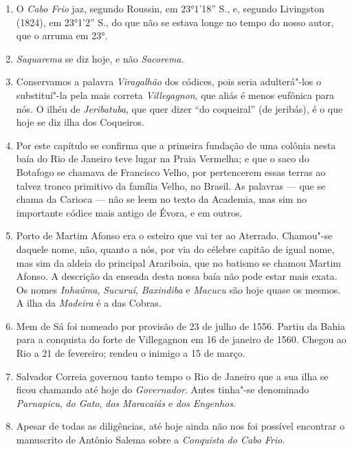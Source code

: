 \begin{enumerate}
\item O \textit{Cabo Frio} jaz, segundo Roussin, em 23°1'18'' S., e, segundo Livingston (1824), 
em 23°1'2'' S., do que não se estava longe no tempo do nosso autor, que o arruma em 
23°. 

\item \textit{Saquarema} se diz hoje, e não \textit{Sacorema}.

\item Conservamos a palavra \textit{Viragalhão} dos códices, pois seria adulterá"-los o 
substituí"-la pela mais correta \textit{Villegagnon}, que aliás é menos eufônica para nós. 
O ilhéu de  \textit{Jeribatuba}, que quer dizer ``do coqueiral'' (de jeribás),
é o que hoje se diz ilha dos Coqueiros.

\item Por este capítulo se confirma que a primeira fundação de uma colônia nesta baía  
do Rio de Janeiro teve lugar na Praia Vermelha; e que o saco do Botafogo se chamava 
de Francisco Velho, por pertencerem essas terras ao  talvez tronco  primitivo da 
família Velho, no Brasil.
As palavras --- que se chama da Carioca --- não se leem no texto da Academia, mas 
sim no importante códice mais antigo de Évora, e em outros.

\item  Porto de Martim Afonso era o esteiro que vai ter ao Aterrado.
Chamou"-se daquele nome, não, quanto a nós, por via do célebre capitão de
igual nome, mas sim da aldeia do principal Arariboia, que no batismo se
chamou Martim Afonso.
A descrição da enseada desta nossa baía não pode estar mais exata. Os nomes  
\textit{Inhaúma}, \textit{Sucuruí}, \textit{Baxindiba} e \textit{Macucu}  são hoje quase os mesmos. A ilha da \textit{Madeira} é a 
das Cobras.

\item Mem de Sá foi nomeado por provisão de 23 de julho de 1556. Partiu da Bahia para a 
conquista do forte de Villegagnon em 16 de janeiro de 1560. Chegou ao Rio a 21 de 
fevereiro; rendeu o inimigo a 15 de março.

\item Salvador Correia governou tanto tempo o Rio de Janeiro que a sua ilha se ficou 
chamando até hoje do \textit{Governador}. Antes tinha"-se denominado \textit{Parnapicu}, 
\textit{do Gato}, \textit{dos Maracaiás} e \textit{dos Engenhos}.

\item Apesar de todas as diligências, até hoje ainda não nos foi possível encontrar o 
manuscrito de Antônio Salema sobre a \textit{Conquista do Cabo Frio}.


\end{enumerate}
